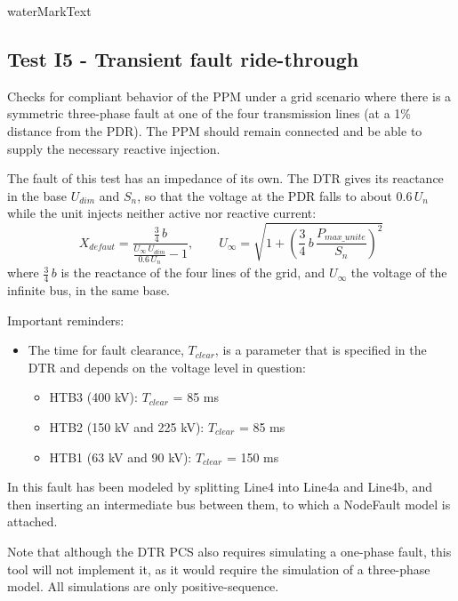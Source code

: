     {{ waterMarkText }}

    \renewcommand{\DTRPcs}{ThreePhaseFault} %
    \renewcommand{\PCSname}{PCS_RTE-I16z3}
    \renewcommand{\OCname}{TransientImpedant}


    \subsection{Test I5 - Transient fault ride-through}

    Checks for compliant behavior of the PPM under a grid scenario where there
    is a symmetric three-phase fault at one of the four transmission lines
    (at a 1\% distance from the PDR). The PPM should remain connected and
    be able to supply the necessary reactive injection.

    The fault of this test has an impedance of its own. The DTR gives its reactance
    in the base $U_{dim}$ and $S_n$, so that the voltage at the PDR falls to
    about $0.6\,U_n$ while the unit injects neither active nor reactive current:
    \[
        X_{defaut} = \frac{\frac{3}{4}\,b}{\frac{U_\infty\,U_{dim}}{0.6\,U_n} - 1},
        \qquad
        U_\infty = \sqrt{1 + \left(\frac{3}{4}\,b\,\frac{P_{max\_unite}}{S_n}\right)^2}
    \]
    where $\frac{3}{4}\,b$ is the reactance of the four lines of the grid, and
    $U_\infty$ the voltage of the infinite bus, in the same base.

    \GridCircuitZthree

    \noindent Important reminders:
    \begin{itemize}
        \item The time for fault clearance, $T_{clear}$, is a parameter that
        is specified in the DTR and depends on the voltage level in
        question:
        \begin{itemize}
            \item HTB3 (400 kV): $T_{clear}$ = 85 ms
            \item HTB2 (150 kV and 225 kV): $T_{clear}$ = 85 ms
            \item HTB1 (63 kV and 90 kV): $T_{clear}$ = 150 ms
        \end{itemize}
    \end{itemize}

    In \Dynawo this fault has been modeled by splitting Line4 into Line4a
    and Line4b, and then inserting an intermediate bus between them, to
    which a NodeFault model is attached.

    Note that although the DTR PCS also requires simulating a one-phase
    fault, this tool will not implement it, as it would require the
    simulation of a three-phase model. All simulations are only
    positive-sequence.

